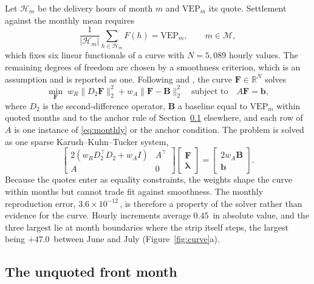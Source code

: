 Let $\mathcal{H}_m$ be the delivery hours of month $m$ and $\mathrm{VEP}_m$
its quote. Settlement against the monthly mean requires
\begin{equation}
  \frac{1}{|\mathcal{H}_m|}\sum_{h\in\mathcal{H}_m} F(h) = \mathrm{VEP}_m,
  \qquad m\in\mathcal{M},
  \label{eq:monthly}
\end{equation}
which fixes six linear functionals of a curve with $N=5{,}089$ hourly values.
The remaining degrees of freedom are chosen by a smoothness criterion, which is
an assumption and is reported as one. Following
\citet{FletenLemming2003} and \citet{BenthKoekebakkerOllmar2007}, the curve
$\mathbf{F}\in\mathbb{R}^N$ solves
\begin{equation}
  \min_{\mathbf{F}}\;
  w_R\lVert D_2\mathbf{F}\rVert_2^2 + w_A\lVert\mathbf{F}-\mathbf{B}\rVert_2^2
  \quad\text{subject to}\quad A\mathbf{F}=\mathbf{b},
  \label{eq:qp}
\end{equation}
where $D_2$ is the second-difference operator, $\mathbf{B}$ a baseline equal to
$\mathrm{VEP}_m$ within quoted months and to the anchor rule of
Section~\ref{sec:anchor} elsewhere, and each row of $A$ is one instance of
\eqref{eq:monthly} or the anchor condition. The problem is solved as one sparse
Karush--Kuhn--Tucker system,
\begin{equation}
  \begin{bmatrix}
    2\left(w_R D_2^{\top}D_2 + w_A I\right) & A^{\top}\\
    A & 0
  \end{bmatrix}
  \begin{bmatrix}\mathbf{F}\\ \boldsymbol{\lambda}\end{bmatrix}
  =
  \begin{bmatrix}2w_A\mathbf{B}\\ \mathbf{b}\end{bmatrix}.
  \label{eq:kkt}
\end{equation}
Because the quotes enter as equality constraints, the weights shape the curve
within months but cannot trade fit against smoothness. The monthly
reproduction error, $3.6\times10^{-12}$\,\TRY, is therefore a property of the
solver rather than evidence for the curve. Hourly increments average
$0.45$\,\TRY{} in absolute value, and the three largest lie at month boundaries
where the strip itself steps, the largest being $+47.0$\,\TRY{} between June
and July (Figure~\ref{fig:curve}a).

\subsection{The unquoted front month}
\label{sec:anchor}

